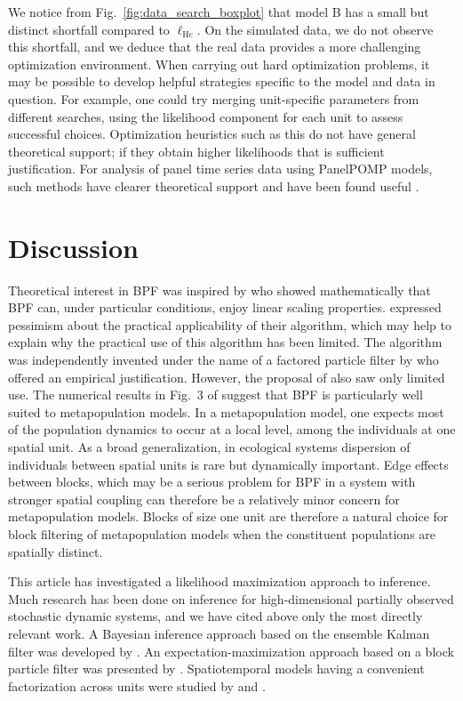 \documentclass[12pt]{article}\usepackage[]{graphicx}\usepackage[]{xcolor}
\begin{document}
We notice from Fig.~\ref{fig:data_search_boxplot} that model B has a small but distinct shortfall compared to $\ell_{\mathrm He}$.
On the simulated data, we do not observe this shortfall, and we deduce that the real data provides a more challenging optimization environment.
When carrying out hard optimization problems, it may be possible to develop helpful strategies specific to the model and data in question.
For example, one could try merging unit-specific parameters from different searches, using the likelihood component for each unit to assess successful choices.
Optimization heuristics such as this do not have general theoretical support; if they obtain higher likelihoods that is sufficient justification. 
For analysis of panel time series data using PanelPOMP models, such methods have clearer theoretical support and have been found useful \citep{breto19}.

\section{Discussion}
\label{sec:discussion}

Theoretical interest in BPF was inspired by \citet{rebeschini15} who showed mathematically that BPF can, under particular conditions, enjoy linear scaling properties.
\citet{rebeschini15} expressed pessimism about the practical applicability of their algorithm, which may help to explain why the practical use of this algorithm has been limited.
The algorithm was independently invented under the name of a factored particle filter by \citet{ng02} who offered an empirical justification.
However, the proposal of \citet{ng02} also saw only limited use.
The numerical results in Fig.~3 of \citet{ionides21} suggest that BPF is particularly well suited to metapopulation models.
In a metapopulation model, one expects most of the population dynamics to occur at a local level, among the individuals at one spatial unit.
As a broad generalization, in ecological systems dispersion of individuals between spatial units is rare but dynamically important.
Edge effects between blocks, which may be a serious problem for BPF in a system with stronger spatial coupling \citep{ionides21} can therefore be a relatively minor concern for metapopulation models.
Blocks of size one unit are therefore a natural choice for block filtering of metapopulation models when the constituent populations are spatially distinct.

This article has investigated a likelihood maximization approach to inference.
Much research has been done on inference for high-dimensional partially observed stochastic dynamic systems, and we have cited above only the most directly relevant work.
A Bayesian inference approach based on the ensemble Kalman filter was developed by \citet{katzfuss19}.
An expectation-maximization approach based on a block particle filter was presented by \citet{finke17}.
Spatiotemporal models having a convenient factorization across units were studied by \citet{beskos17} and \citet{xu19}.
\end{document}
